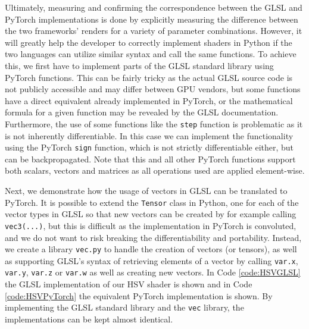 Ultimately, measuring and confirming the correspondence between the GLSL and PyTorch implementations is done by explicitly measuring the difference between the two frameworks' renders for a variety of parameter combinations. However, it will greatly help the developer to correctly implement shaders in Python if the two languages can utilize similar syntax and call the same functions. To achieve this, we first have to implement parts of the GLSL standard library using PyTorch functions. This can be fairly tricky as the actual GLSL source code is not publicly accessible and may differ between GPU vendors, but some functions have a direct equivalent already implemented in PyTorch, or the mathematical formula for a given function may be revealed by the GLSL documentation. Furthermore, the use of some functions like the \texttt{step} function is problematic as it is not inherently differentiable. In this case we can implement the functionality using the PyTorch \texttt{sign} function, which is not strictly differentiable either, but can be backpropagated. Note that this and all other PyTorch functions support both scalars, vectors and matrices as all operations used are applied element-wise.





Next, we demonstrate how the usage of vectors in GLSL can be translated to PyTorch. It is possible to extend the \texttt{Tensor} class in Python, one for each of the vector types in GLSL so that new vectors can be created by for example calling \texttt{vec3(...)}, but this is difficult as the implementation in PyTorch is convoluted, and we do not want to risk breaking the differentiability and portability. Instead, we create a library \texttt{vec.py} to handle the creation of vectors (or tensors), as well as supporting GLSL's syntax of retrieving elements of a vector by calling \texttt{var.x}, \texttt{var.y}, \texttt{var.z} or \texttt{var.w} as well as creating new vectors. In Code \ref{code:HSVGLSL} the GLSL implementation of our HSV shader is shown and in Code \ref{code:HSVPyTorch} the equivalent PyTorch implementation is shown. By implementing the GLSL standard library and the \texttt{vec} library, the implementations can be kept almost identical.

